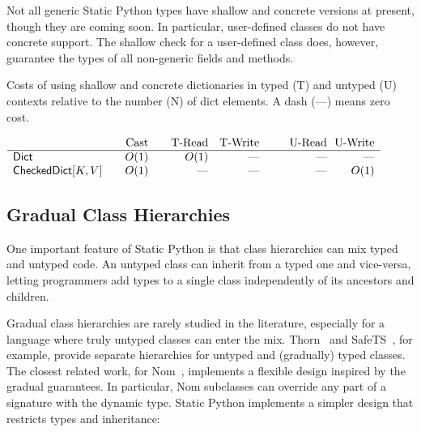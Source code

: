 \documentclass[english,cleveref,crc]{programming}
\newcommand{\SP}{Static Python}
\newcommand{\typefont}[1]{\mathsf{#1}}
\newcommand{\paramtype}[2]{#1[#2]}
\newcommand{\sptrawpydict}{\typefont{Dict}}
\newcommand{\sptrawchkdict}{\typefont{CheckedDict}} %
\newcommand{\sptchkdict}[2]{\paramtype{\sptrawchkdict}{#1, #2}}
\begin{document}
Not all generic \SP{} types have shallow and concrete versions at present,
though they are coming soon.
In particular, user-defined classes do not have concrete support.
The shallow check for a user-defined class does, however, guarantee the types
of all non-generic fields and methods.

\begin{table}[t]
  \newcommand{\nocost}{\textrm{---}}
  \caption{Costs of using shallow and concrete dictionaries in typed (T) and untyped (U) contexts relative to the number (N) of dict elements. A dash (\nocost{}) means zero cost.}
  \label{t:shallow-vs-concrete}

  \centering
  \(\begin{array}{l@{\qquad}r@{\qquad}rr@{~~}@{\qquad}r@{~~}r}
                                        & \mbox{Cast} & \mbox{T-Read} & \mbox{T-Write} & \mbox{U-Read} & \mbox{U-Write} \\\hline
    \sptrawpydict                       &        O(1) &          O(1) &      \nocost{} &     \nocost{} &      \nocost{} \\
    \sptchkdict{K}{V}                   &        O(1) &     \nocost{} &      \nocost{} &     \nocost{} &           O(1)
  \end{array}\)
\end{table}



\subsection{Gradual Class Hierarchies}
\label{s:inheritance}

One important feature of \SP{} is that class hierarchies can
mix typed and untyped code.
An untyped class can inherit from a typed one and vice-versa,
letting programmers add types to a single class independently of its ancestors
and children.


Gradual class hierarchies are rarely studied in the literature, especially
for a language where truly untyped classes can enter the mix.
Thorn~\cite{wzlov-popl-2010} and SafeTS~\cite{rsfbv-popl-2015}, for example,
provide separate hierarchies for untyped and (gradually) typed classes.
The closest related work, for Nom~\cite{mt-oopsla-2017}, implements
a flexible design inspired by the gradual guarantees.
In particular, Nom subclasses can override any part of a signature with the
dynamic type.
\SP{} implements a simpler design that restricts types and
inheritance:
\end{document}
